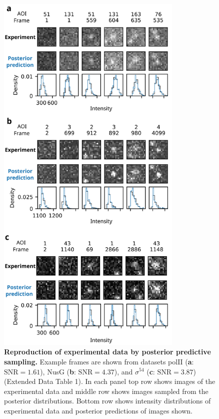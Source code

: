 \begin{figure}[h]
\centering
\includegraphics[width=89mm]{figures/figure4/figure4.png}
\caption{\textbf{Reproduction of experimental data by posterior predictive sampling.} Example frames are shown from datasets polII (\textbf{a}: $\mathrm{SNR}=1.61$), NusG (\textbf{b}: $\mathrm{SNR}=4.37$), and $\sigma^{54}$ (\textbf{c}: $\mathrm{SNR}=3.87$) (Extended Data Table 1). In each panel top row shows images of the experimental data and middle row shows images sampled from the posterior distributions. Bottom row shows intensity distributions of experimental data and posterior predictions of images shown. }
\label{fig:posterior_samples}
\end{figure}

